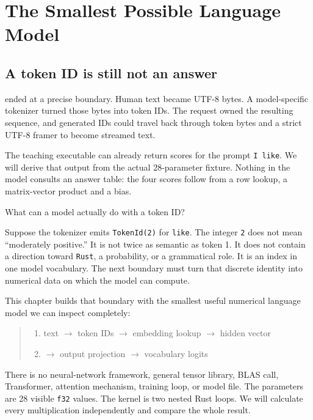 \chapter{The Smallest Possible Language Model}\label{chapter-3-the-smallest-possible-language-model}\label{app:smallest-model}
\section{A token ID is still not an
answer}\label{a-token-id-is-still-not-an-answer}

 ended at a precise boundary. Human text became UTF-8 bytes. A
model-specific tokenizer turned those bytes into token IDs. The request
owned the resulting sequence, and generated IDs could travel back
through token bytes and a strict UTF-8 framer to become streamed text.

The teaching executable can already return scores for the prompt
\texttt{I like}. We will derive that output from the
actual 28-parameter fixture. Nothing in the model consults an answer table:
the four scores follow from a row lookup, a matrix-vector product and a bias.

What can a model actually do with a token ID?

Suppose the tokenizer emits \texttt{TokenId(2)} for \texttt{like}. The
integer \texttt{2} does not mean ``moderately positive.'' It is not
twice as semantic as token 1. It does not contain a direction toward
\texttt{Rust}, a probability, or a grammatical role. It is an index in
one model vocabulary. The next boundary must turn that discrete identity
into numerical data on which the model can compute.

This chapter builds that boundary with the smallest useful numerical
language model we can inspect completely:

\begin{quote}
\begin{enumerate}
\item text  \(\longrightarrow\)  token IDs  \(\longrightarrow\)  embedding lookup  \(\longrightarrow\)  hidden vector
\item \(\longrightarrow\)  output projection  \(\longrightarrow\)  vocabulary logits
\end{enumerate}
\end{quote}

There is no neural-network framework, general tensor library, BLAS call,
Transformer, attention mechanism, training loop, or model file. The
parameters are 28 visible \texttt{f32} values. The kernel is two nested
Rust loops. We will calculate every multiplication independently and
compare the whole result.


